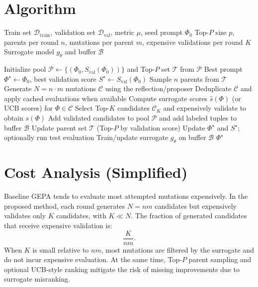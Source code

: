 \section{Algorithm}
\begin{algorithm}[H]
\caption{Surrogate-Guided Bandit GEPA}
\label{alg:bandit_gepa}
\begin{algorithmic}[1]
\Require Train set $\mathcal{D}_{\text{train}}$, validation set $\mathcal{D}_{\text{val}}$, metric $\mu$, seed prompt $\Phi_0$
\Require Top-$P$ size $p$, parents per round $n$, mutations per parent $m$, expensive validations per round $K$
\Require Surrogate model $g_\theta$ and buffer $\mathcal{B}$

\State Initialize pool $\mathcal{P}\leftarrow\{(\Phi_0,S_{\text{val}}(\Phi_0))\}$ and Top-$P$ set $\mathcal{T}$ from $\mathcal{P}$
\State Best prompt $\Phi^\star \leftarrow \Phi_0$, best validation score $S^\star \leftarrow S_{\text{val}}(\Phi_0)$
    \State Sample $n$ parents from $\mathcal{T}$
    \State Generate $N=n\cdot m$ mutations $\mathcal{C}$ using the reflection/proposer
    \State Deduplicate $\mathcal{C}$ and apply cached evaluations when available
    \State Compute surrogate scores $\widehat{s}(\Phi)$ (or UCB scores) for $\Phi\in\mathcal{C}$
    \State Select Top-$K$ candidates $\mathcal{C}_K$ and expensively validate to obtain $s(\Phi)$
    \State Add validated candidates to pool $\mathcal{P}$ and add labeled tuples to buffer $\mathcal{B}$
    \State Update parent set $\mathcal{T}$ (Top-$P$ by validation score)
        \State Update $\Phi^\star$ and $S^\star$; optionally run test evaluation
    \EndIf
    \State Train/update surrogate $g_\theta$ on buffer $\mathcal{B}$
\EndWhile
\State \Return $\Phi^\star$
\end{algorithmic}
\end{algorithm}

\section{Cost Analysis (Simplified)}
Baseline GEPA tends to evaluate most attempted mutations expensively. In the proposed method, each round generates $N=n m$ candidates but expensively validates only $K$ candidates, with $K \ll N$. The fraction of generated candidates that receive expensive validation is:
\[
\frac{K}{nm}.
\]
When $K$ is small relative to $nm$, most mutations are filtered by the surrogate and do not incur expensive evaluation. At the same time, Top-$P$ parent sampling and optional UCB-style ranking mitigate the risk of missing improvements due to surrogate misranking.

